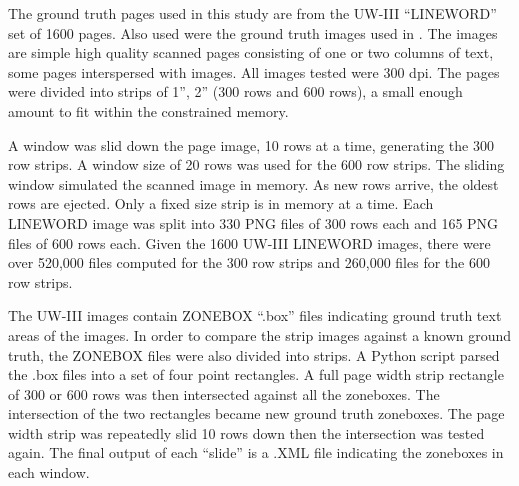 \documentclass[conference]{IEEEtran}
\begin{document}
The ground truth pages used in this study are from the UW-III “LINEWORD” set of
1600 pages. Also used were the ground truth images used in \cite{IEEEhowto:Winder}. The
\cite{IEEEhowto:Winder} images are simple high quality scanned pages consisting of one or two
columns of text, some pages interspersed with images. All images tested were
300 dpi.  The pages were divided into strips of 1”, 2” (300 rows and 600 rows),
a small enough amount to fit within the constrained memory. 


A window was slid down the page image, 10 rows at a time, generating the 300
row strips. A window size of 20 rows was used for the 600 row strips.  The
sliding window simulated the scanned image in memory. As new rows arrive, the
oldest rows are ejected. Only a fixed size strip is in memory at a time. Each
LINEWORD image was split into 330 PNG files of 300 rows each and 165 PNG files
of 600 rows each.  Given the 1600 UW-III LINEWORD images, there were over
520,000 files computed for the 300 row strips and 260,000 files for the 600 row
strips.

The UW-III images contain ZONEBOX “.box” files indicating ground truth text
areas of the images. In order to compare the strip images against a known
ground truth, the ZONEBOX files were also divided into strips. A Python script
parsed the .box files into a set of four point rectangles. A full page width
strip rectangle of 300 or 600 rows was then intersected against all the
zoneboxes. The intersection of the two rectangles became new ground truth
zoneboxes. The page width strip was repeatedly slid 10 rows down then the
intersection was tested again. The final output of each “slide” is a .XML file
indicating the zoneboxes in each window.
\end{document}
